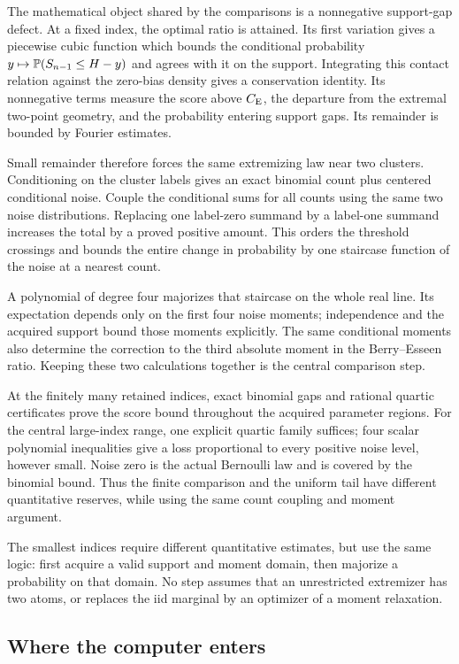 The mathematical object shared by the comparisons is a nonnegative
support-gap defect. At a fixed index, the optimal ratio is attained.
Its first variation gives a piecewise cubic function which bounds the
conditional probability $y\mapsto\mathbb P(S_{n-1}\le H-y)$ and agrees
with it on the support. Integrating this contact relation against the
zero-bias density gives a conservation identity. Its nonnegative terms
measure the score above $C_{\mathrm E}$, the departure from the extremal
two-point geometry, and the probability entering support gaps. Its
remainder is bounded by Fourier estimates.

Small remainder therefore forces the same extremizing law near two
clusters. Conditioning on the cluster labels gives an exact binomial
count plus centered conditional noise. Couple the conditional sums for
all counts using the same two noise distributions. Replacing one
label-zero summand by a label-one summand increases the total by a
proved positive amount. This orders the threshold crossings and bounds
the entire change in probability by one staircase function of the noise
at a nearest count.

A polynomial of degree four majorizes that staircase on the whole real
line. Its expectation depends only on the first four noise moments;
independence and the acquired support bound those moments explicitly.
The same conditional moments also determine the correction to the third
absolute moment in the Berry--Esseen ratio. Keeping these two calculations
together is the central comparison step.

At the finitely many retained indices, exact binomial gaps and rational
quartic certificates prove the score bound throughout the acquired
parameter regions. For the central large-index range, one explicit
quartic family suffices; four scalar polynomial inequalities give a loss
proportional to every positive noise level, however small. Noise zero is
the actual Bernoulli law and is covered by the binomial bound. Thus the
finite comparison and the uniform tail have different quantitative
reserves, while using the same count coupling and moment argument.

The smallest indices require different quantitative estimates, but
use the same logic: first acquire a valid support and moment domain,
then majorize a probability on that domain. No step assumes that an
unrestricted extremizer has two atoms, or replaces the iid marginal by
an optimizer of a moment relaxation.

\subsection{Where the computer enters}

